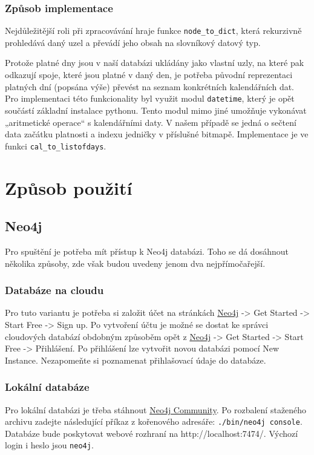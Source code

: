 \documentclass[10pt,xcolor=pdflatex,dvipsnames,table,oneside]{book}
\begin{document}
\subsection{Způsob implementace}
Nejdůležitější roli při zpracovávání hraje funkce \verb|node_to_dict|, která rekurzivně prohledává daný uzel a převádí jeho obsah na slovníkový datový typ.

Protože platné dny jsou v naší databázi ukládány jako vlastní uzly, na které pak odkazují spoje, které jsou platné v daný den, je potřeba původní reprezentaci platných dní (popsána výše) převést na seznam konkrétních kalendářních dat. Pro implementaci této funkcionality byl využit modul \verb|datetime|, který je opět součástí základní instalace pythonu. Tento modul mimo jiné umožňuje vykonávat „aritmetické operace“ s kalendářními daty. V našem případě se jedná o sečtení data začátku platnosti a indexu jedničky v příslušné bitmapě. Implementace je ve funkci \verb|cal_to_listofdays|.

\chapter{Způsob použití}

\section{Neo4j}

Pro spuštění je potřeba mít přístup k Neo4j databázi. Toho se dá dosáhnout několika způsoby, zde však budou uvedeny
jenom dva nejpřímočařejší.

\subsection{Databáze na cloudu}
Pro tuto variantu je potřeba si založit účet na stránkách \href{https://neo4j.com/}{Neo4j} -> Get Started -> Start Free -> Sign up.
Po vytvoření účtu je možné se dostat ke správci cloudových databází obdobným způsoběm opět z \href{https://neo4j.com/}{Neo4j} ->
Get Started -> Start Free -> Přihlášení. Po přihlášení lze vytvořit novou databázi pomocí New Instance. Nezapomeňte si
poznamenat přihlašovací údaje do databáze.

\subsection{Lokální databáze}
Pro lokální databázi je třeba stáhnout \href{https://neo4j.com/download-center/#community}{Neo4j Community}.
Po rozbalení staženého archivu zadejte následující příkaz z kořenového adresáře: \verb|./bin/neo4j console|.
Databáze bude poskytovat webové rozhraní na http://localhost:7474/. Výchozí login i heslo jsou \verb|neo4j|.
\end{document}
